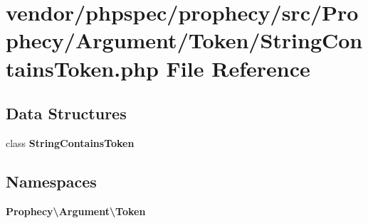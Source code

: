\section{vendor/phpspec/prophecy/src/\+Prophecy/\+Argument/\+Token/\+String\+Contains\+Token.php File Reference}
\label{_string_contains_token_8php}
\subsection*{Data Structures}
\begin{DoxyCompactItemize}
\item 
class {\bf String\+Contains\+Token}
\end{DoxyCompactItemize}
\subsection*{Namespaces}
\begin{DoxyCompactItemize}
\item 
 {\bf Prophecy\textbackslash{}\+Argument\textbackslash{}\+Token}
\end{DoxyCompactItemize}

